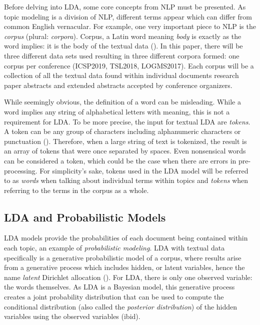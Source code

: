\documentclass[a4paper, 12pt, twoside]{article}
\numberwithin{equation}{section} %
\begin{document}
Before delving into LDA, some core concepts from NLP must be presented. As topic modeling is a division of NLP, different terms appear which can differ from common English vernacular. For example, one very important piece to NLP is the \textit{corpus} (plural: \textit{corpora}). Corpus, a Latin word meaning \textit{body} is exactly as the word implies: it is the body of the textual data (\cite{IR2018}). In this paper, there will be three different data sets used resulting in three different corpora formed: one corpus per conference (ICSP2019, TSL2018, LOGMS2017). Each corpus will be a collection of all the textual data found within individual documents \textemdash  research paper abstracts and extended abstracts accepted by conference organizers. 

While seemingly obvious, the definition of a word can be misleading. While a word implies any string of alphabetical letters with meaning, this is not a requirement for LDA. To be more precise, the input for textual LDA are \textit{tokens}. A token can be any group of characters including alphanumeric characters or punctuation (\cite{IR2018}). Therefore, when a large string of text is tokenized, the result is an array of tokens that were once separated by spaces. Even nonsensical words can be considered a token, which could be the case when there are errors in pre-processing. For simplicity's sake, tokens used in the LDA model will be referred to as \textit{words} when talking about individual terms within topics and \textit{tokens} when referring to the terms in the corpus as a whole. 

\subsection{LDA and Probabilistic Models}

LDA models provide the probabilities of each document being contained within each topic, an example of \textit{probabilistic modeling}. LDA with textual data specifically is a generative probabilistic model of a corpus, where results arise from a generative process which includes hidden, or latent variables, hence the name \textit{latent} Dirichlet allocation (\cite{blei2012}). For LDA, there is only one observed variable: the words themselves. As LDA is a Bayesian model, this generative process creates a joint probability distribution that can be used to compute the conditional distribution (also called the \textit{posterior distribution}) of the hidden variables using the observed variables (ibid). 
\end{document}
